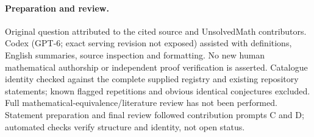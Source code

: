 \documentclass[11pt]{article}
\begin{document}
\paragraph{Preparation and review.}
Original question attributed to the cited source and UnsolvedMath contributors. Codex (GPT-6; exact serving revision not exposed) assisted with definitions, English summaries, source inspection and formatting. No new human mathematical authorship or independent proof verification is asserted. Catalogue identity checked against the complete supplied registry and existing repository statements; known flagged repetitions and obvious identical conjectures excluded. Full mathematical-equivalence/literature review has not been performed. Statement preparation and final review followed contribution prompts C and D; automated checks verify structure and identity, not open status.
\label{end:statement}
\end{document}
